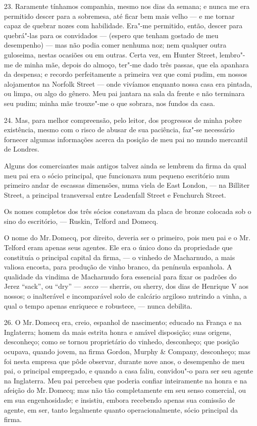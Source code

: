 23. Raramente tínhamos companhia, mesmo nos dias da semana; e nunca me
era permitido descer para a sobremesa, até ficar bem mais velho --- e me
tornar capaz de quebrar nozes com habilidade. Era"-me permitido, então,
descer para quebrá"-las para os convidados --- (espero que tenham gostado
de meu desempenho) --- mas não podia comer nenhuma noz; nem qualquer
outra guloseima, nestas ocasiões ou em outras. Certa vez, em Hunter
Street, lembro"-me de minha mãe, depois do almoço, ter"-me dado três
passas, que ela apanhara da despensa; e recordo perfeitamente a primeira
vez que comi pudim, em nossos alojamentos na Norfolk Street --- onde
vivíamos enquanto nossa casa era pintada, ou limpa, ou algo do gênero.
Meu pai jantara na sala da frente e não terminara seu pudim; minha mãe
trouxe"-me o que sobrara, nos fundos da casa.

24. Mas, para melhor compreensão, pelo leitor, dos progressos de minha
pobre existência, mesmo com o risco de abusar de sua paciência, faz"-se
necessário fornecer algumas informações acerca da posição de meu pai no
mundo mercantil de Londres.

Alguns dos comerciantes mais antigos talvez ainda se lembrem da firma da
qual meu pai era o sócio principal, que funcionava num pequeno
escritório num primeiro andar de escassas dimensões, numa viela de East
London, --- na Billiter Street, a principal transversal entre Leadenfall
Street e Fenchurch Street.

Os nomes completos dos três sócios constavam da placa de bronze colocada
sob o sino do escritório, --- Ruskin, Telford and Domecq.

O nome do Mr.\,Domecq, por direito, deveria ser o primeiro, pois meu pai e
o Mr.\,Telford eram apenas seus agentes. Ele era o único dono da
propriedade que constituía o principal capital da firma, --- o vinhedo de
Macharnudo, a mais valiosa encosta, para produção de vinho branco, da
península espanhola. A qualidade da vindima de Macharnudo fora essencial
para fixar os padrões do Jerez ``sack'', ou ``dry'' --- \emph{secco} ---
sherris, ou sherry, dos dias de Henrique V aos nossos; o inalterável e
incomparável solo de calcário argiloso nutrindo a vinha, a qual o tempo
apenas enriquece e robustece, --- nunca debilita.

26. O Mr.\,Domecq era, creio, espanhol de nascimento; educado na França e
na Inglaterra; homem da mais estrita honra e amável disposição; suas
origens, desconheço; como se tornou proprietário do vinhedo, desconheço;
que posição ocupava, quando jovem, na firma Gordon, Murphy \& Company,
desconheço; mas foi nesta empresa que pôde observar, durante nove anos,
o desempenho de meu pai, o principal empregado, e quando a casa faliu,
convidou"-o para ser seu agente na Inglaterra. Meu pai percebeu que
poderia confiar inteiramente na honra e na afeição do Mr.\,Domecq; mas não
tão completamente em seu senso comercial, ou em sua engenhosidade; e
insistiu, embora recebendo apenas sua comissão de agente, em ser, tanto
legalmente quanto operacionalmente, sócio principal da firma.

